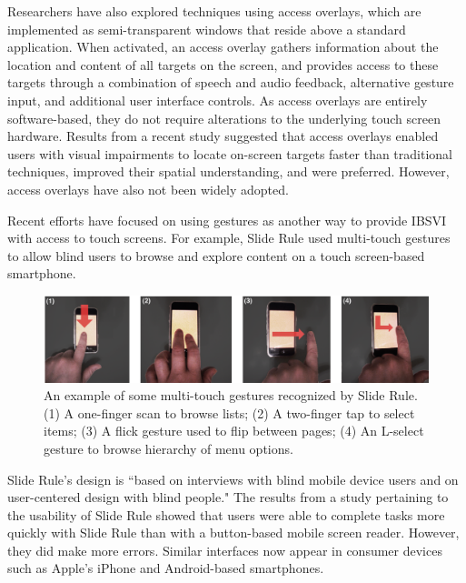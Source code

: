 \documentclass[11pt]{article}
\begin{document}
Researchers have also explored techniques using access overlays, which are implemented as semi-transparent windows that reside above a standard application. When activated, an access overlay gathers information about the location and content of all targets on the screen, and provides access to these targets through a combination of speech and audio feedback, alternative gesture input, and additional user interface controls. As access overlays are entirely software-based, they do not require alterations to the underlying touch screen hardware. Results from a recent study suggested that access overlays enabled users with visual impairments to locate on-screen targets faster than traditional techniques, improved their spatial understanding, and were preferred.\cite{Kane:2011:AOI:2047196.2047232} However,  access overlays have also not been widely adopted.

Recent efforts have focused on using gestures as another way to provide IBSVI with access to touch screens. For example, Slide Rule \cite{Kane:2008:SRM:1414471.1414487} used multi-touch gestures to allow blind users to browse and explore content on a touch screen-based smartphone. 


\begin{figure}[ht]
\centering
\includegraphics[width=4.5in]{slide-rule.jpg} 
\caption{An example of some multi-touch gestures recognized by Slide Rule.(1) A one-finger scan to browse lists; (2) A two-finger tap to select items; (3) A flick gesture used to flip between pages; (4) An L-select gesture to browse hierarchy of menu options. \cite{Kane:2008:SRM:1414471.1414487} }
\label{figure-sample}
\end{figure}

Slide Rule's design is ``based on interviews with blind mobile device users and on user-centered design with blind people." \cite{Kane:2008:SRM:1414471.1414487} The results from a study pertaining to the usability of Slide Rule showed that users were able to complete tasks more quickly with Slide Rule than with a button-based mobile screen reader. However, they did make more errors. \cite{Kane:2008:SRM:1414471.1414487} Similar interfaces now appear in consumer devices such as Apple's iPhone\cite{AppleMultiTouch} and Android-based smartphones.\cite{AndroidMultiTouch}
\end{document}
